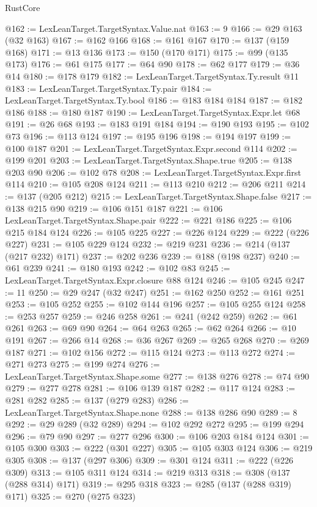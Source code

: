 \begin{lexlean}{RustCore}
\begin{coremodule}
{\begin{coremodule}
{{{{{{{{{{{{{{{{{{{{{{{{{{{{{{{{{{{{{{{{{{{{{@162 := LexLeanTarget.TargetSyntax.Value.nat
@163 := 9
@166 := @29 @163 (@32 @163)
@167 := @162 @166
@168 := @161 @167
@170 := @137 (@159 @168)
@171 := @13 @136
@173 := @150 (@170 @171)
@175 := @99 (@135 @173)
@176 := @61 @175
@177 := @64 @90
@178 := @62 @177
@179 := @36 @14
@180 := @178 @179
@182 := LexLeanTarget.TargetSyntax.Ty.result @11
@183 := LexLeanTarget.TargetSyntax.Ty.pair
@184 := LexLeanTarget.TargetSyntax.Ty.bool
@186 := @183 @184 @184
@187 := @182 @186
@188 := @180 @187
@190 := LexLeanTarget.TargetSyntax.Expr.let @68
@191 := @26 @68
@193 := @183 @191 @184
@194 := @190 @193
@195 := @102 @73
@196 := @113 @124
@197 := @195 @196
@198 := @194 @197
@199 := @100 @187
@201 := LexLeanTarget.TargetSyntax.Expr.second @114
@202 := @199 @201
@203 := LexLeanTarget.TargetSyntax.Shape.true
@205 := @138 @203 @90
@206 := @102 @78
@208 := LexLeanTarget.TargetSyntax.Expr.first @114
@210 := @105 @208 @124
@211 := @113 @210
@212 := @206 @211
@214 := @137 (@205 @212)
@215 := LexLeanTarget.TargetSyntax.Shape.false
@217 := @138 @215 @90
@219 := @106 @151 @187
@221 := @106 LexLeanTarget.TargetSyntax.Shape.pair
@222 := @221 @186
@225 := @106 @215 @184 @124
@226 := @105 @225
@227 := @226 @124
@229 := @222 (@226 @227)
@231 := @105 @229 @124
@232 := @219 @231
@236 := @214 (@137 (@217 @232) @171)
@237 := @202 @236
@239 := @188 (@198 @237)
@240 := @61 @239
@241 := @180 @193
@242 := @102 @83
@245 := LexLeanTarget.TargetSyntax.Expr.closure @88 @124
@246 := @105 @245
@247 := 11
@250 := @29 @247 (@32 @247)
@251 := @162 @250
@252 := @161 @251
@253 := @105 @252
@255 := @102 @144 @196
@257 := @105 @255 @124
@258 := @253 @257
@259 := @246 @258
@261 := @241 (@242 @259)
@262 := @61 @261
@263 := @69 @90
@264 := @64 @263
@265 := @62 @264
@266 := @10 @191
@267 := @266 @14
@268 := @36 @267
@269 := @265 @268
@270 := @269 @187
@271 := @102 @156
@272 := @115 @124
@273 := @113 @272
@274 := @271 @273
@275 := @199 @274
@276 := LexLeanTarget.TargetSyntax.Shape.some
@277 := @138 @276
@278 := @74 @90
@279 := @277 @278
@281 := @106 @139 @187
@282 := @117 @124
@283 := @281 @282
@285 := @137 (@279 @283)
@286 := LexLeanTarget.TargetSyntax.Shape.none
@288 := @138 @286 @90
@289 := 8
@292 := @29 @289 (@32 @289)
@294 := @102 @292 @272
@295 := @199 @294
@296 := @79 @90
@297 := @277 @296
@300 := @106 @203 @184 @124
@301 := @105 @300
@303 := @222 (@301 @227)
@305 := @105 @303 @124
@306 := @219 @305
@308 := @137 (@297 @306)
@309 := @301 @124
@311 := @222 (@226 @309)
@313 := @105 @311 @124
@314 := @219 @313
@318 := @308 (@137 (@288 @314) @171)
@319 := @295 @318
@323 := @285 (@137 (@288 @319) @171)
@325 := @270 (@275 @323)
}}}}}}}}}}}}}}}}}}}}}}}}}}}}}}}}}}}}}}}}}}}}}
\end{coremodule}}
\end{coremodule}
\end{lexlean}
